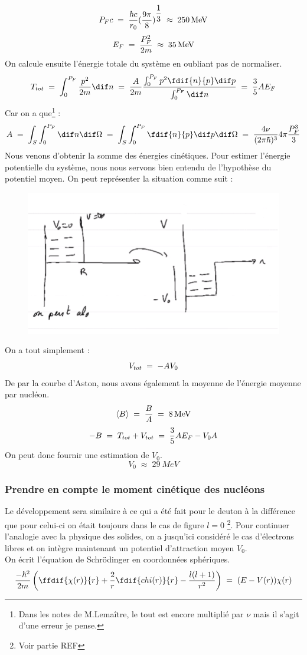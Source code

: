 \[
    P_F c \; = \; \dfrac{\hbar c}{r_0}(\dfrac{9\pi}{8})^{\dfrac{1}{3}}\; \approx \; \SI{250}{MeV}
\]
\[
    E_F\; = \; \dfrac{P_F^2}{2m}  \; \approx \; \SI{35}{MeV}
\]
On calcule ensuite l'énergie totale du système en oubliant pas de normaliser.
\[
    T_{tot}\eq \int_0^{P_F} \dfrac{p^2}{2m}\dif n 
    \eq \dfrac{A}{2m} \dfrac{\int_0^{P_F} p^2 \fdif{n}{p}\dif p}{\int_0^{P_F}\dif n}
    \eq \dfrac{3}{5} A E_F
\]
Car on a que\footnote{Dans les notes de M.Lemaître, le tout est encore multiplié par $\nu$ mais il s'agit d'une erreur je pense.} :
\[
    A \eq \int_S\int_0^{P_F}\dif n \dif\Omega \eq \int_S\int_0^{P_F}\fdif{n}{p} \dif p \dif\Omega \eq \dfrac{4\nu}{(2\pi\hbar)^3} 4\pi \dfrac{P_F^3}{3}
\]
Nous venons d'obtenir la somme des énergies cinétiques. Pour estimer l'énergie potentielle du système, nous nous servons bien entendu de l'hypothèse du potentiel moyen. On peut représenter la situation comme suit :
\begin{figure}
    \centering
    \includegraphics{Images4/puits2.PNG}
\end{figure}
On a tout simplement :
\[
    V_{tot} \; = \; -A V_0
\]
De par la courbe d'Aston, nous avons également la moyenne de l'énergie moyenne par nucléon.
\[
    \expval{B} \; = \; \dfrac{B}{A} \; = \; \SI{8}{MeV}
\]
\[
    -B \; = \; T_{tot} + V_{tot} \; = \; \dfrac{3}{5}A E_F - V_0 A
\]
On peut donc fournir une estimation de $V_0$.
\[
    V_0 \; \approx \; \SI{29}{MeV}
\]
\subsubsection{Prendre en compte le moment cinétique des nucléons}
Le développement sera similaire à ce qui a été fait pour le deuton à la différence que pour celui-ci on était toujours dans le cas de figure $l=0$ \footnote{Voir partie REF}. Pour continuer l'analogie avec la physique des solides, on a jusqu'ici considéré le cas d'électrons libres et on intègre maintenant un potentiel d'attraction moyen $V_0$.\\
On écrit l'équation de Schrödinger en coordonnées sphériques.
\[
       \dfrac{-\hbar^2}{2m} \left(\ffdif{\chi(r)}{r} + \dfrac{2}{r}\fdif{chi(r)}{r} - \dfrac{l(l+1)}{r^2}\right)\eq (E-V(r))\chi(r)
\]

